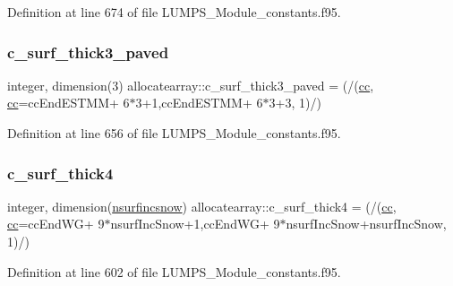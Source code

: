 Definition at line 674 of file L\+U\+M\+P\+S\+\_\+\+Module\+\_\+constants.\+f95.

\mbox{\label{namespaceallocatearray_adc3c9e44723c88e7ec4732af652dd5eb}} 
\subsubsection{\texorpdfstring{c\+\_\+surf\+\_\+thick3\+\_\+paved}{c\_surf\_thick3\_paved}}
{\footnotesize\ttfamily integer, dimension(3) allocatearray\+::c\+\_\+surf\+\_\+thick3\+\_\+paved = (/(\hyperlink{namespaceallocatearray_ac863c81704eb507dee10f5e10741e10c}{cc}, \hyperlink{namespaceallocatearray_ac863c81704eb507dee10f5e10741e10c}{cc}=cc\+End\+E\+S\+T\+MM+ 6$\ast$3+1,cc\+End\+E\+S\+T\+MM+ 6$\ast$3+3, 1)/)}



Definition at line 656 of file L\+U\+M\+P\+S\+\_\+\+Module\+\_\+constants.\+f95.

\mbox{\label{namespaceallocatearray_a1d34ddb04c02fc201a2a1f467ab5afe0}} 
\subsubsection{\texorpdfstring{c\+\_\+surf\+\_\+thick4}{c\_surf\_thick4}}
{\footnotesize\ttfamily integer, dimension(\hyperlink{namespaceallocatearray_af4d113f332b6759cfa22271140c9162d}{nsurfincsnow}) allocatearray\+::c\+\_\+surf\+\_\+thick4 = (/(\hyperlink{namespaceallocatearray_ac863c81704eb507dee10f5e10741e10c}{cc}, \hyperlink{namespaceallocatearray_ac863c81704eb507dee10f5e10741e10c}{cc}=cc\+End\+WG+ 9$\ast$nsurf\+Inc\+Snow+1,cc\+End\+WG+ 9$\ast$nsurf\+Inc\+Snow+nsurf\+Inc\+Snow, 1)/)}



Definition at line 602 of file L\+U\+M\+P\+S\+\_\+\+Module\+\_\+constants.\+f95.

\mbox{\label{namespaceallocatearray_ac2194bcb7399903732a361af05dd38b7}} 
